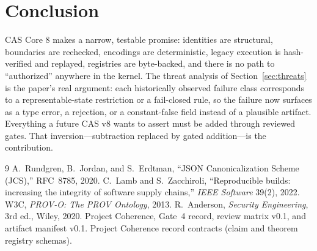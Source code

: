 \documentclass[11pt]{amsart}
\theoremstyle{definition}
\theoremstyle{remark}
\begin{document}
\section{Conclusion}

CAS Core 8 makes a narrow, testable promise: identities are structural, boundaries are rechecked, encodings are deterministic, legacy execution is hash-verified and replayed, registries are byte-backed, and there is no path to ``authorized'' anywhere in the kernel. The threat analysis of Section~\ref{sec:threats} is the paper's real argument: each historically observed failure class corresponds to a representable-state restriction or a fail-closed rule, so the failure now surfaces as a type error, a rejection, or a constant-false field instead of a plausible artifact. Everything a future CAS v8 wants to assert must be added through reviewed gates. That inversion---subtraction replaced by gated addition---is the contribution.

\begin{thebibliography}{9}
 A.~Rundgren, B.~Jordan, and S.~Erdtman, ``JSON Canonicalization Scheme (JCS),'' RFC~8785, 2020.
 C.~Lamb and S.~Zacchiroli, ``Reproducible builds: increasing the integrity of software supply chains,'' \emph{IEEE Software} 39(2), 2022.
 W3C, \emph{PROV-O: The PROV Ontology}, 2013.
 R.~Anderson, \emph{Security Engineering}, 3rd ed., Wiley, 2020.
 Project Coherence, Gate~4 record, review matrix v0.1, and artifact manifest v0.1.
 Project Coherence record contracts (claim and theorem registry schemas).
\end{thebibliography}
\end{document}

